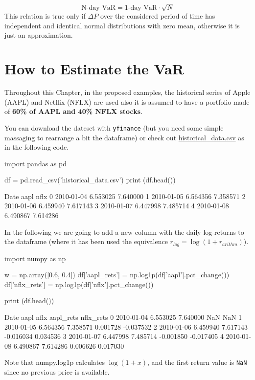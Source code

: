 \begin{equation}
\textrm{N-day VaR} = \textrm{1-day VaR}\cdot \sqrt{N}
\label{eq:var_horizon}
\end{equation}
This relation is true only if $\Delta P$ over the considered period of time has independent and identical normal distributions with zero mean, otherwise it is just an approximation.

\section{How to Estimate the VaR}
\label{how-to-estimate-the-var}

Throughout this Chapter, in the proposed examples, the historical series of Apple (AAPL) and Netflix (NFLX) are used also it is assumed to have a portfolio made of \textbf{60\% of AAPL and 40\% NFLX stocks}.
 
You can download the dateset with \texttt{yfinance} (but you need some simple massaging to rearrange a bit the dataframe) or check out \href{https://raw.githubusercontent.com/matteosan1/finance_course/develop/libro/input_files/historical_data.csv}{historical\_data.csv} as in the following code.

\begin{ipython}
import pandas as pd

df = pd.read_csv('historical_data.csv')	
print (df.head())
\end{ipython}
\begin{ioutput}
         Date      aapl      nflx
0  2010-01-04  6.553025  7.640000
1  2010-01-05  6.564356  7.358571
2  2010-01-06  6.459940  7.617143
3  2010-01-07  6.447998  7.485714
4  2010-01-08  6.490867  7.614286
\end{ioutput}
\noindent
In the following we are going to add a new column with the daily log-returns to the dataframe (where it has been used the equivalence $r_{log} = \log(1+r_{arithm})$).

\begin{ipython}
import numpy as np

w = np.array([0.6, 0.4])
df['aapl_rets'] = np.log1p(df['aapl'].pct_change())
df['nflx_rets'] = np.log1p(df['nflx'].pct_change())

print (df.head())
\end{ipython}
\begin{ioutput}
         Date      aapl      nflx  aapl_rets  nflx_rets
0  2010-01-04  6.553025  7.640000        NaN        NaN
1  2010-01-05  6.564356  7.358571   0.001728  -0.037532
2  2010-01-06  6.459940  7.617143  -0.016034   0.034536
3  2010-01-07  6.447998  7.485714  -0.001850  -0.017405
4  2010-01-08  6.490867  7.614286   0.006626   0.017030
\end{ioutput}
Note that \textrm{numpy.log1p} calculates $\log(1 + x)$, and the first return value is \texttt{NaN} since no previous price is available.

